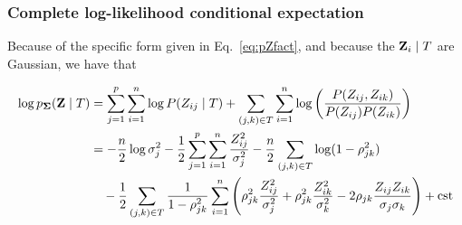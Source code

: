 \subsubsection*{Complete log-likelihood conditional expectation}
Because of the specific form given in Eq.~\eqref{eq:pZfact}, and because the ${\bf Z}_i\mid T$  are Gaussian, we have that
\begin{linenomath*} 
\begin{align}
    \label{eq:logpZ.T}
    \log{p_{\boldsymbol{\Sigma}}}({\bf Z} \mid T)
    & = \sum_{j=1}^p \sum_{i=1}^n \log P(Z_{ij} \mid T) 
    + \sum_{(j, k) \in T} \sum_{i=1}^n \log \left(\frac{P(Z_{ij}, Z_{ik})}{P(Z_{ij})P(Z_{ik})}\right) \nonumber \\
    & = - \frac{n}2 \log \sigma_j^2 -\frac12 \sum_{j=1}^p \sum_{i=1}^n \frac{Z_{ij}^2}{\sigma_j^2}
    - \frac{n}2 \sum_{(j, k) \in T} \log (1- \rho_{jk}^2) \\
    & \quad - \frac12 \sum_{(j, k) \in T} \frac1{1- \rho_{jk}^2} \sum_{i=1}^n \left(
    \rho^2_{jk} \frac{Z_{ij}^2}{\sigma_j^2} + \rho^2_{jk} \frac{Z_{ik}^2}{\sigma_k^2} - 2\rho_{jk} \frac{Z_{ij} Z_{ik}}{\sigma_j \sigma_k}
    \right)
    + \text{cst} \nonumber 
\end{align}
\end{linenomath*}

